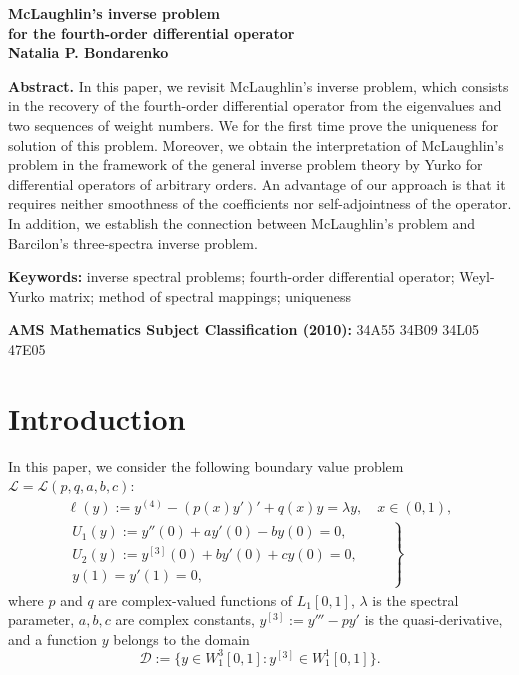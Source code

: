 \documentclass[a4paper,12pt]{article}
\newcommand{\la}{\lambda}
\theoremstyle{plain}
\numberwithin{equation}{section}
\theoremstyle{definition}
\theoremstyle{remark}
\begin{document}
\begin{center}
{\Large\bf McLaughlin's inverse problem \\[0.2cm] for the fourth-order differential operator}
\\[0.2cm]
{\bf Natalia P. Bondarenko} \\[0.2cm]
\end{center}

\vspace{0.5cm}

{\bf Abstract.} In this paper, we revisit McLaughlin's inverse problem, which consists in the recovery of the fourth-order differential operator from the eigenvalues and two sequences of weight numbers. We for the first time prove the uniqueness for solution of this problem. Moreover, we obtain the interpretation of McLaughlin's problem in the framework of the general inverse problem theory by Yurko for differential operators of arbitrary orders. An advantage of our approach is that it requires neither smoothness of the coefficients nor self-adjointness of the operator. In addition, we establish the connection between McLaughlin's problem and Barcilon's three-spectra inverse problem.

\medskip

{\bf Keywords:} inverse spectral problems; fourth-order differential operator; Weyl-Yurko matrix; method of spectral mappings; uniqueness

\medskip

{\bf AMS Mathematics Subject Classification (2010):} 34A55 34B09 34L05 47E05 

\vspace{1cm}

\section{Introduction} \label{sec:intr}

In this paper, we consider the following boundary value problem $\mathcal L = \mathcal L(p, q, a, b, c)$:
\begin{gather} \label{eqv}
\ell(y) := y^{(4)} - (p(x) y')' + q(x) y = \la y, \quad x \in (0,1), \\ \label{bc}
\left.\begin{array}{c}
U_1(y) := y''(0) + ay'(0) - b y(0) = 0, \\
U_2(y) := y^{[3]}(0) + b y'(0) + c y(0) = 0, \\
y(1) = y'(1) = 0,
\end{array}\qquad \right\}
\end{gather}
where $p$ and $q$ are complex-valued functions of $L_1[0,1]$, $\la$ is the spectral parameter, $a, b, c$ are complex constants, $y^{[3]} := y''' - p y'$ is the quasi-derivative, and a function $y$ belongs to the domain
$$
\mathcal D := \{ y \in W_1^3[0,1] \colon y^{[3]} \in W_1^1[0,1] \}.
$$
\end{document}
